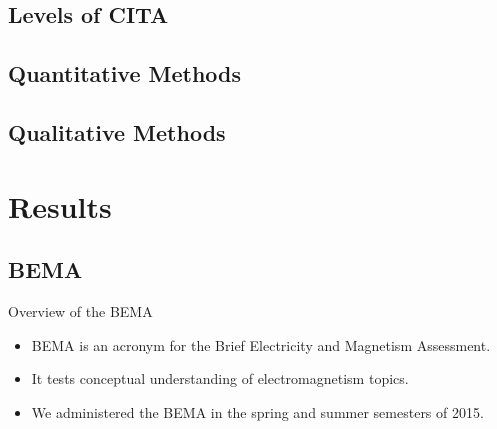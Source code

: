 \documentclass{beamer}
\begin{document}
\subsection*{Levels of CITA}
\subsection*{Quantitative Methods}
\subsection*{Qualitative Methods}

\section{Results}

\subsection*{BEMA}

\begin{frame}{Overview of the BEMA}
\begin{itemize}
\item BEMA is an acronym for the Brief Electricity and Magnetism Assessment.
\item It tests conceptual understanding of electromagnetism topics.
\item We administered the BEMA in the spring and summer semesters of 2015.
\end{itemize}
\end{frame}
\end{document}
